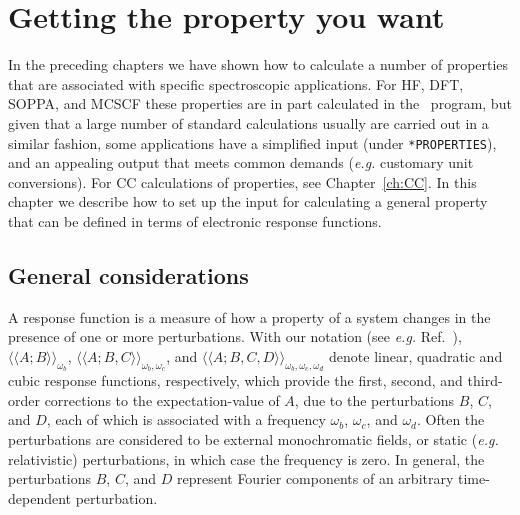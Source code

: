 \chapter{Getting the property you want}\label{ch:rspchap}


In the preceding chapters we have shown how to calculate a number of
properties that are associated with specific spectroscopic applications.
For HF, DFT, SOPPA, and MCSCF these properties are in part
calculated in the \resp\ program, but given that a large number of
standard calculations usually are carried out in a similar fashion, some
applications have a simplified input (under {\tt **PROPERTIES}), 
and an appealing output that meets common demands 
({\it e.g.\/} customary unit conversions).
For CC calculations of properties, see Chapter~\ref{ch:CC}.
In this chapter we
describe how to set up the input for calculating a general property that
can be defined in terms of electronic response functions. 

\section{General considerations}
\label{sec:rspgen}

\begin{center}
\end{center}

A response function is a measure of how a property of a system changes in
the presence of one or more perturbations. With our notation (see {\it e.g.\/}
Ref.~\cite{jopjjcp82}),  $\langle\!\langle A;B\rangle\!\rangle_{\omega_b}$,
$\langle\!\langle A;B,C\rangle\!\rangle_{\omega_b,\omega_c}$, and 
$\langle\!\langle A;B,C,D\rangle\!\rangle_{\omega_b,\omega_c,\omega_d}$
denote linear, quadratic and cubic response
functions, respectively, which
provide the first, second, and third-order corrections to the
expectation-value of $A$, due to the perturbations $B$, $C$, and $D$, each of
which is associated with a frequency $\omega_b$, $\omega_c$, and
$\omega_d$. Often the perturbations are considered to be 
external monochromatic fields, or static ({\it e.g.\/} relativistic) perturbations,
in which case the frequency is zero.   In general, the perturbations $B$,
$C$, and $D$ represent Fourier components of an arbitrary time-dependent
perturbation.

